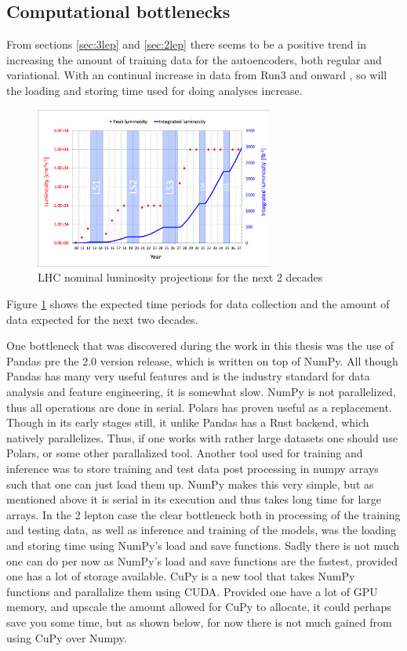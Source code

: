 \subsection*{Computational bottlenecks}
From sections \ref{sec:3lep} and \ref{sec:2lep} there seems to be a positive trend in increasing the amount 
of training data for the autoencoders, both regular and variational. With an continual increase in data from 
Run3 and onward \cite{LHC_int_lum}, so will the loading and storing time used for doing analyses increase. 

\begin{figure}[H]
    \caption[LHC nominal luminosity projections]{LHC nominal luminosity projections for the next 2 decades}
    \label{fig:lhc_nom}
    \centering
    \includegraphics[width=0.7\textwidth]{Figures/atlas/LHC-nominal-lumi-projection.png}
\end{figure}
Figure \ref{fig:lhc_nom} shows the expected time periods for data collection and the amount of data expected for 
the next two decades. \par
One bottleneck that was discovered during the work in this thesis was the use of Pandas pre the 2.0 version release, which is 
written on top of NumPy. All though Pandas has many very useful features and is the industry standard for 
data analysis and feature engineering, it is somewhat slow. NumPy is not parallelized, thus all operations are 
done in serial. Polars has proven useful as a replacement. Though in its early stages still, it unlike Pandas 
has a Rust backend, which natively parallelizes. Thus, if one works with rather large datasets one should use
Polars, or some other parallalized tool. Another tool used for training and inference was to store training 
and test data post processing in numpy arrays such that one can just load them up. NumPy makes this very simple, 
but as mentioned above it is serial in its execution and thus takes long time for large arrays. In the 2 lepton 
case the clear bottleneck both in processing of the training and testing data, as well as inference and training 
of the models, was the loading and storing time using NumPy's load and save functions. Sadly there is not much 
one can do per now as NumPy's load and save functions are the fastest, provided one has a lot of storage available. 
CuPy\cite{cupy_learningsys2017} is a new tool that takes NumPy functions and parallalize them using CUDA. Provided 
one have a lot of GPU memory, and upscale the amount allowed for CuPy to allocate, it could perhaps save you some time, 
but as shown below, for now there is not much gained from using CuPy over Numpy. 

